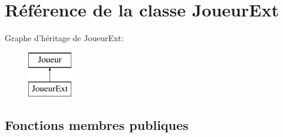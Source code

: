 \hypertarget{classJoueurExt}{\section{Référence de la classe Joueur\-Ext}
\label{classJoueurExt}
}
Graphe d'héritage de Joueur\-Ext\-:\begin{figure}[H]
\begin{center}
\leavevmode
\includegraphics[height=2.000000cm]{classJoueurExt}
\end{center}
\end{figure}
\subsection*{Fonctions membres publiques}
